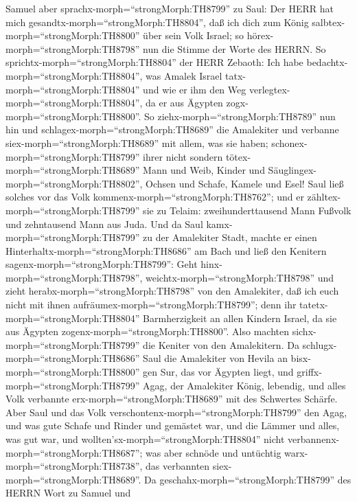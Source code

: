  Samuel aber sprachx-morph=``strongMorph:TH8799'' zu Saul:
Der HERR hat mich gesandtx-morph=``strongMorph:TH8804'', daß ich dich
zum König salbtex-morph=``strongMorph:TH8800'' über sein Volk Israel; so
hörex-morph=``strongMorph:TH8798'' nun die Stimme der Worte des HERRN.
 So sprichtx-morph=``strongMorph:TH8804'' der HERR Zebaoth:
Ich habe bedachtx-morph=``strongMorph:TH8804'', was Amalek Israel
tatx-morph=``strongMorph:TH8804'' und wie er ihm den Weg
verlegtex-morph=``strongMorph:TH8804'', da er aus Ägypten
zogx-morph=``strongMorph:TH8800''.  So
ziehx-morph=``strongMorph:TH8789'' nun hin und
schlagex-morph=``strongMorph:TH8689'' die Amalekiter und verbanne
siex-morph=``strongMorph:TH8689'' mit allem, was sie haben;
schonex-morph=``strongMorph:TH8799'' ihrer nicht sondern
tötex-morph=``strongMorph:TH8689'' Mann und Weib, Kinder und
Säuglingex-morph=``strongMorph:TH8802'', Ochsen und Schafe, Kamele und
Esel!  Saul ließ solches vor das Volk
kommenx-morph=``strongMorph:TH8762''; und er
zähltex-morph=``strongMorph:TH8799'' sie zu Telaim: zweihunderttausend
Mann Fußvolk und zehntausend Mann aus Juda.  Und da Saul
kamx-morph=``strongMorph:TH8799'' zu der Amalekiter Stadt, machte er
einen Hinterhaltx-morph=``strongMorph:TH8686'' am Bach  und
ließ den Kenitern sagenx-morph=``strongMorph:TH8799'': Geht
hinx-morph=``strongMorph:TH8798'', weichtx-morph=``strongMorph:TH8798''
und zieht herabx-morph=``strongMorph:TH8798'' von den Amalekiter, daß
ich euch nicht mit ihnen aufräumex-morph=``strongMorph:TH8799''; denn
ihr tatetx-morph=``strongMorph:TH8804'' Barmherzigkeit an allen Kindern
Israel, da sie aus Ägypten zogenx-morph=``strongMorph:TH8800''. Also
machten sichx-morph=``strongMorph:TH8799'' die Keniter von den
Amalekitern.  Da schlugx-morph=``strongMorph:TH8686'' Saul
die Amalekiter von Hevila an bisx-morph=``strongMorph:TH8800'' gen Sur,
das vor Ägypten liegt,  und
griffx-morph=``strongMorph:TH8799'' Agag, der Amalekiter König,
lebendig, und alles Volk verbannte erx-morph=``strongMorph:TH8689'' mit
des Schwertes Schärfe.  Aber Saul und das Volk
verschontenx-morph=``strongMorph:TH8799'' den Agag, und was gute Schafe
und Rinder und gemästet war, und die Lämmer und alles, was gut war, und
wollten'sx-morph=``strongMorph:TH8804'' nicht
verbannenx-morph=``strongMorph:TH8687''; was aber schnöde und untüchtig
warx-morph=``strongMorph:TH8738'', das verbannten
siex-morph=``strongMorph:TH8689''.  Da
geschahx-morph=``strongMorph:TH8799'' des HERRN Wort zu Samuel und
